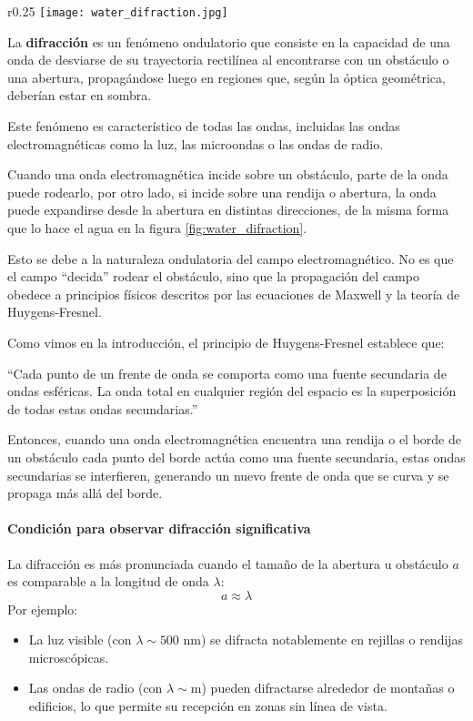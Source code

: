 \begin{wrapfigure}{r}{0.25\textwidth}
  \centering
  \texttt{[image: water\_difraction.jpg]}
  \caption{Fenómeno de difracción en agua}
  \label{fig:water_difraction}
\end{wrapfigure}
La \textbf{difracción} es un fenómeno ondulatorio que consiste en la capacidad de una onda de desviarse de su trayectoria rectilínea al encontrarse con un obstáculo o una abertura, propagándose luego en regiones que, según la óptica geométrica, deberían estar en sombra.

Este fenómeno es característico de todas las ondas, incluidas las ondas electromagnéticas como la luz, las microondas o las ondas de radio.

Cuando una onda electromagnética incide sobre un obstáculo, parte de la onda puede rodearlo, por otro lado, si incide sobre una rendija o abertura, la onda puede expandirse desde la abertura en distintas direcciones, de la misma forma que lo hace el agua en la figura \ref{fig:water_difraction}.

Esto se debe a la naturaleza ondulatoria del campo electromagnético. No es que el campo ``decida'' rodear el obstáculo, sino que la propagación del campo obedece a principios físicos descritos por las ecuaciones de Maxwell y la teoría de Huygens-Fresnel.

Como vimos en la introducción, el principio de Huygens-Fresnel establece que:

``Cada punto de un frente de onda se comporta como una fuente secundaria de ondas esféricas. La onda total en cualquier región del espacio es la superposición de todas estas ondas secundarias.''

Entonces, cuando una onda electromagnética encuentra una rendija o el borde de un obstáculo cada punto del borde actúa como una fuente secundaria, estas ondas secundarias se interfieren, generando un nuevo frente de onda que se curva y se propaga más allá del borde.

\paragraph{Condición para observar difracción significativa}

La difracción es más pronunciada cuando el tamaño de la abertura u obstáculo \(a\) es comparable a la longitud de onda \(\lambda\):
\[
a \approx \lambda
\]
Por ejemplo:
\begin{itemize}
  \item La luz visible (con \(\lambda \sim 500 \text{ nm}\)) se difracta notablemente en rejillas o rendijas microscópicas.
  \item Las ondas de radio (con \(\lambda \sim \text{m}\)) pueden difractarse alrededor de montañas o edificios, lo que permite su recepción en zonas sin línea de vista.
\end{itemize}

